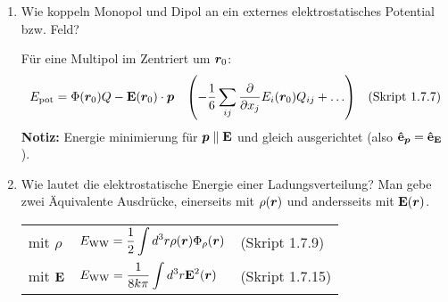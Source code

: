 \begin{enumerate}
  \item Wie koppeln Monopol und Dipol an ein externes elektrostatisches
        Potential bzw. Feld?
        
        Für eine Multipol im Zentriert um $\vb* r_0$:
        $$E_{\text{pot}}=\Phi(\vb* r_0)Q-\vb E(\vb* r_0)\cdot\vb* p 
        \quad\qty(-\frac{1}{6}\sum_{ij}\pdv{x_j}E_i(\vb* r_0)Q_{ij}
        +\ldots)
        \quad\text{(Skript 1.7.7)}$$
        \textbf{Notiz:} Energie minimierung für $\vb* p\parallel \vb E$
        und gleich ausgerichtet (also $\vu e_{\vb* p}=\vu e_{\vb E}$).\\

  \clearpage
  \item Wie lautet die elektrostatische Energie einer Ladungsverteilung?
        Man gebe zwei Äquivalente Ausdrücke, einerseits mit $\rho(\vb* r)$
        und andersseits mit $\vb E(\vb* r)$.
        \begin{center}
        \begin{tabular}{lll}
          mit $\rho$    & $\displaystyle E_{\text{WW}}=
                          \frac{1}{2}\int d^3 r\rho(\vb* r)
                          \Phi_\rho(\vb* r)$
                            &(Skript 1.7.9)\\
          mit $\vb E$   & $\displaystyle E_{\text{WW}}=\frac{1}{8k\pi}
                           \int d^3 r\vb E^2(\vb* r)$
                            &(Skript 1.7.15)\\
        \end{tabular}
        \end{center}


\end{enumerate}
